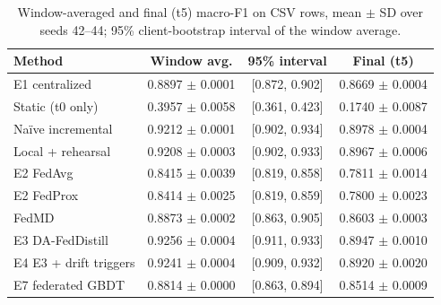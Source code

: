 \begin{table}[t]
\centering
\caption{Window-averaged and final (t5) macro-F1 on CSV rows, mean $\pm$ SD over seeds 42--44; 95\% client-bootstrap interval of the window average.}
\label{tab:headline}
\begin{tabular}{lccc}
\toprule
Method & Window avg. & 95\% interval & Final (t5) \\
\midrule
E1 centralized & 0.8897 $\pm$ 0.0001 & [0.872, 0.902] & 0.8669 $\pm$ 0.0004 \\
Static (t0 only) & 0.3957 $\pm$ 0.0058 & [0.361, 0.423] & 0.1740 $\pm$ 0.0087 \\
Naïve incremental & 0.9212 $\pm$ 0.0001 & [0.902, 0.934] & 0.8978 $\pm$ 0.0004 \\
Local + rehearsal & 0.9208 $\pm$ 0.0003 & [0.902, 0.933] & 0.8967 $\pm$ 0.0006 \\
E2 FedAvg & 0.8415 $\pm$ 0.0039 & [0.819, 0.858] & 0.7811 $\pm$ 0.0014 \\
E2 FedProx & 0.8414 $\pm$ 0.0025 & [0.819, 0.859] & 0.7800 $\pm$ 0.0023 \\
FedMD & 0.8873 $\pm$ 0.0002 & [0.863, 0.905] & 0.8603 $\pm$ 0.0003 \\
E3 DA-FedDistill & 0.9256 $\pm$ 0.0004 & [0.911, 0.933] & 0.8947 $\pm$ 0.0010 \\
E4 E3 + drift triggers & 0.9241 $\pm$ 0.0004 & [0.909, 0.932] & 0.8920 $\pm$ 0.0020 \\
E7 federated GBDT & 0.8814 $\pm$ 0.0000 & [0.863, 0.894] & 0.8514 $\pm$ 0.0009 \\
\bottomrule
\end{tabular}
\end{table}
